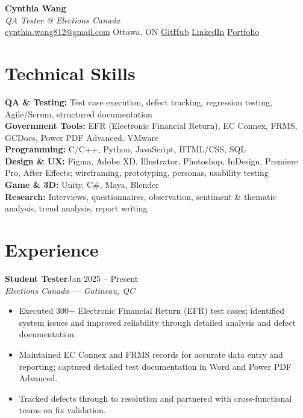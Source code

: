 \documentclass[letterpaper,11pt]{article}
\newcommand{\roleline}[2]{%
  \textbf{\large #1}\hfill{\small #2}\\[-2pt]
}
\newcommand{\orgline}[1]{%
  {\small\textit{#1}}\\[-3pt]
}
\newcommand{\bulletsstart}{\begin{itemize}\footnotesize}
\newcommand{\bulletsend}{\end{itemize}}
\begin{document}
\begin{center}
{\LARGE \textbf{Cynthia Wang}}\\[-2pt]
{\normalsize \textit{QA Tester @ Elections Canada}}\\[-3pt]
{\small
\href{mailto:cynthia.wang812@gmail.com}{cynthia.wang812@gmail.com} \textbullet{}
Ottawa, ON \textbullet{}
\href{https://github.com/cynw22}{GitHub} \textbullet{}
\href{https://www.linkedin.com/in/cynthia-wang-7b9290298}{LinkedIn} \textbullet{}
\href{https://cynw22.github.io/Portfolio2/}{Portfolio}
}
\end{center}

\section{Technical Skills}
{\small
\textbf{QA \& Testing:} Test case execution, defect tracking, regression testing, Agile/Scrum, structured documentation \\
\textbf{Government Tools:} EFR (Electronic Financial Return), EC Connex, FRMS, GCDocs, Power PDF Advanced, VMware \\
\textbf{Programming:} C/C++, Python, JavaScript, HTML/CSS, SQL \\
\textbf{Design \& UX:} Figma, Adobe XD, Illustrator, Photoshop, InDesign, Premiere Pro, After Effects; wireframing, prototyping, personas, usability testing \\
\textbf{Game \& 3D:} Unity, C\#, Maya, Blender \\
\textbf{Research:} Interviews, questionnaires, observation, sentiment \& thematic analysis, trend analysis, report writing
}

\section{Experience}

\roleline{Student Tester}{Jan 2025 -- Present}
\orgline{Elections Canada --- Gatineau, QC}
\bulletsstart
  \item Executed 300+ Electronic Financial Return (EFR) test cases; identified system issues and improved reliability through detailed analysis and defect documentation.
  \item Maintained EC Connex and FRMS records for accurate data entry and reporting; captured detailed test documentation in Word and Power PDF Advanced.
  \item Tracked defects through to resolution and partnered with cross-functional teams on fix validation.
\bulletsend
\end{document}
